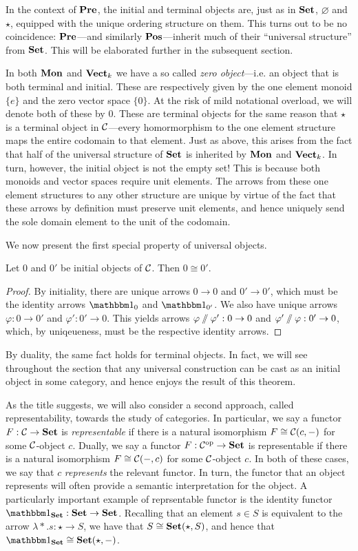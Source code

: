 In the context of $\mathbf{Pre}$, the initial and terminal objects are, just as in $\mathbf{Set}$, $\varnothing$ and $\star$, equipped with the unique ordering structure on them. This turns out to be no coincidence: $\mathbf{Pre}$---and similarly $\mathbf{Pos}$---inherit much of their ``universal structure'' from $\mathbf{Set}$. This will be elaborated further in the subsequent section.

In both $\mathbf{Mon}$ and $\mathbf{Vect}_k$ we have a so called \emph{zero object}---i.e. an object that is both terminal and initial. These are respectively given by the one element monoid $\{e\}$ and the zero vector space $\{0\}$. At the risk of mild notational overload, we will denote both of these by $0$. These are terminal objects for the same reason that $\star$ is a terminal object in $\mathcal{C}$---every homormorphism to the one element structure maps the entire codomain to that element. Just as above, this arises from the fact that half of the universal structure of $\mathbf{Set}$ is inherited by $\mathbf{Mon}$ and $\mathbf{Vect}_k$. In turn, however, the initial object is not the empty set! This is because both monoids and vector spaces require unit elements. The arrows from these one element structures to any other structure are unique by virtue of the fact that these arrows by definition must preserve unit elements, and hence uniquely send the sole domain element to the unit of the codomain.

We now present the first special property of universal objects.

\begin{prop} Let $0$ and $0'$ be initial objects of $\mathcal{C}$. Then $0\cong0'$. 
\end{prop}
\begin{proof}
By initiality, there are unique arrows $0\to 0$ and $0'\to 0'$, which must be the identity arrows $\Id{0}$ and $\Id{0'}$. We also have unique arrows $\varphi:0\to 0'$ and $\varphi':0'\to 0$. This yields arrows $\varphi\sslash\varphi':0\to 0$ and $\varphi'\sslash\varphi:0'\to0$, which, by uniqeueness, must be the respective identity arrows.
\end{proof}

By duality, the same fact holds for terminal objects. In fact, we will see throughout the section that any universal construction can be cast as an initial object in some category, and hence enjoys the result of this theorem.

As the title suggests, we will also consider a second approach, called representability, towards the study of categories. In particular, we say a functor $F:\mathcal{C}\to\mathbf{Set}$ is \emph{representable} if there is a natural isomorphism $F\cong\mathcal{C}(c,-)$ for some $\mathcal{C}$-object $c$. Dually, we say a functor  $F:\mathcal{C}^{\text{op}}\to\mathbf{Set}$ is representable if there is a natural isomorphism $F\cong\mathcal{C}(-,c)$ for some $\mathcal{C}$-object $c$. In both of these cases, we say that $c$ \emph{represents} the relevant functor. In turn, the functor that an object represents will often provide a semantic interpretation for the object. A particularly important example of reprsentable functor is the identity functor $\Id{\Set}:\Set\to\Set$. Recalling that an element $s\in S$ is equivalent to the arrow $\lambda*.s:\star\to S$, we have that $S\cong\mathbf{Set}(\star, S)$, and hence that $\Id{\Set}\cong\Set(\star,-)$. 

